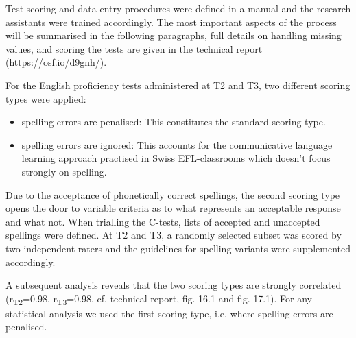\documentclass[output=paper]{langsci/langscibook}
\begin{document}
Test scoring and data entry procedures were defined in a manual and the research assistants were trained accordingly. The most important aspects of the process will be summarised in the following paragraphs, full details on handling missing values, and scoring the tests are given in the technical report (https://osf.io/d9gnh/).

For the English proficiency tests administered at T2 and T3, two different scoring types were applied: 

\begin{itemize}
\item
spelling errors are penalised: This constitutes the standard scoring type.
\item
spelling errors are ignored: This accounts for the communicative language learning approach practised in Swiss EFL-classrooms which doesn’t focus strongly on spelling.
\end{itemize}

Due to the acceptance of phonetically correct spellings, the second scoring type opens the door to variable criteria as to what represents an acceptable response and what not. When trialling the C-tests, lists of accepted and unaccepted spellings were defined. At T2 and T3, a randomly selected subset was scored by two independent raters and the guidelines for spelling variants were supplemented accordingly. 

A subsequent analysis reveals that the two scoring types are strongly correlated (r\textsubscript{T2}=0.98, r\textsubscript{T3}=0.98, cf. technical report, fig. 16.1 and fig. 17.1). For any statistical analysis we used the first scoring type, i.e. where spelling errors are penalised.
\sloppy\printbibliography[heading=subbibliography,notkeyword=this]
\end{document}
